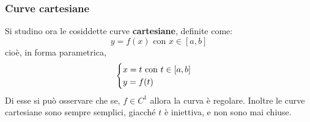 \subsubsection{Curve cartesiane}
    Si studino ora le cosiddette curve \textbf{cartesiane}, definite come: 
    \begin{equation*}
        y=f(x) \text{ con } x \in [a,b] 
    \end{equation*}
    cioè, in forma parametrica,
    \begin{equation*}
        \begin{cases}
            x=t \text{ con } t\in[a,b]\\ y=f(t)
        \end{cases}\\
    \end{equation*}
    Di esse si può osservare che se, $f \in C^1$ allora la curva è regolare. Inoltre le curve cartesiane sono sempre semplici, giacché $t$ è iniettiva, e non sono mai chiuse.

